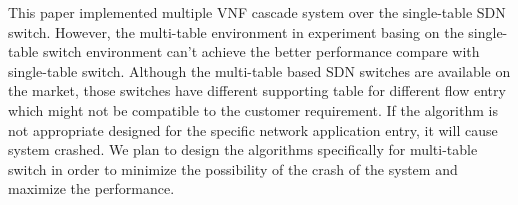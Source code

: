 \documentclass[conference]{IEEEtran}
\begin{document}
This paper implemented multiple VNF cascade system over the single-table SDN switch. However, the multi-table environment in experiment basing on the single-table switch environment can't achieve the better performance compare with single-table switch. Although the multi-table based SDN switches are available on the market, those switches have different supporting table for different flow entry which might not be compatible to the customer requirement. If the algorithm is not appropriate designed for the specific network application entry, it will cause system crashed. We plan to design the algorithms specifically for multi-table switch in order to minimize the possibility of the crash of the system and maximize the performance.



\end{document}

